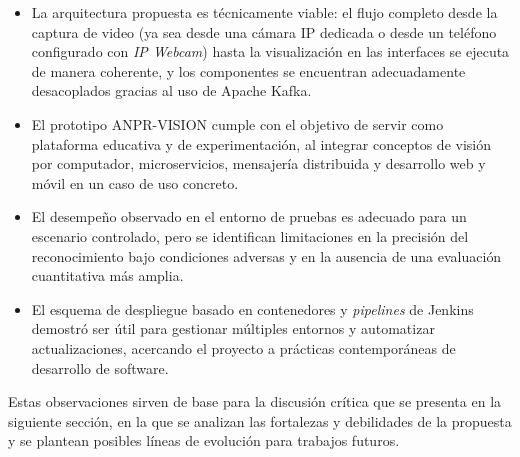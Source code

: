 \begin{itemize}
    \item La arquitectura propuesta es técnicamente viable: el flujo completo desde la captura de video (ya sea desde una cámara IP dedicada o desde un teléfono configurado con \textit{IP Webcam}) hasta la visualización en las interfaces se ejecuta de manera coherente, y los componentes se encuentran adecuadamente desacoplados gracias al uso de Apache Kafka.
    \item El prototipo ANPR-VISION cumple con el objetivo de servir como plataforma educativa y de experimentación, al integrar conceptos de visión por computador, microservicios, mensajería distribuida y desarrollo web y móvil en un caso de uso concreto.
    \item El desempeño observado en el entorno de pruebas es adecuado para un escenario controlado, pero se identifican limitaciones en la precisión del reconocimiento bajo condiciones adversas y en la ausencia de una evaluación cuantitativa más amplia.
    \item El esquema de despliegue basado en contenedores y \textit{pipelines} de Jenkins demostró ser útil para gestionar múltiples entornos y automatizar actualizaciones, acercando el proyecto a prácticas contemporáneas de desarrollo de software.
\end{itemize}

Estas observaciones sirven de base para la discusión crítica que se presenta en la siguiente sección, en la que se analizan las fortalezas y debilidades de la propuesta y se plantean posibles líneas de evolución para trabajos futuros.
